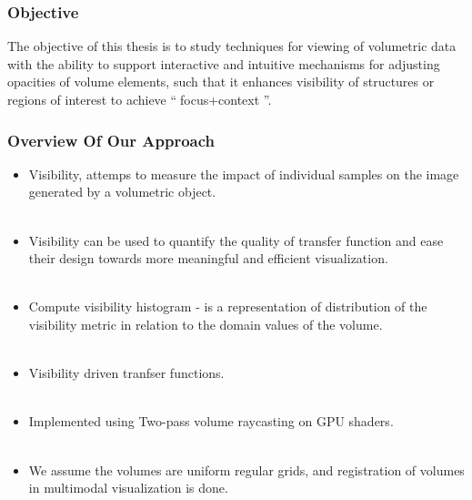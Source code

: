 \documentclass{beamer}
\begin{document}


\begin{frame}
\frametitle{Objective}
The objective of this thesis is to study techniques for viewing of volumetric data with the ability to support interactive and intuitive mechanisms for adjusting opacities of volume elements, such that it enhances visibility of structures or regions of interest to achieve  \textquotedblleft $\;$focus+context \textquotedblright.
\end{frame}


\begin{frame}
\frametitle{Overview Of Our Approach}

\begin{itemize}
\item Visibility, attemps to measure the impact of individual samples on the image generated by a volumetric object.\\ $ $
\item Visibility can be used to quantify the quality of transfer function  and ease their design towards more meaningful and efficient visualization. \\ $ $
\item Compute visibility histogram - is a representation of distribution of the visibility metric in relation to the domain values of the volume. \\ $ $
\item Visibility driven tranfser functions. \\ $ $
\item Implemented using Two-pass volume raycasting on GPU shaders. \\ $ $
\item We assume the volumes are uniform regular grids, and registration of volumes in multimodal visualization is done.

\end{itemize}

\end{frame}

\end{document}
